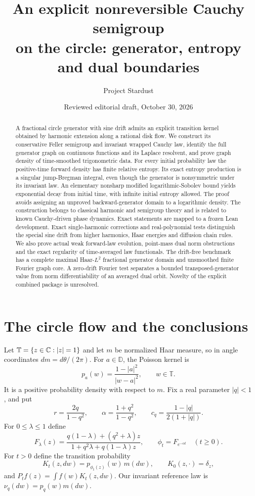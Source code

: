 \documentclass[11pt]{article}
\title{An explicit nonreversible Cauchy semigroup\protect\\
on the circle: generator, entropy and dual boundaries}
\author{Project Stardust}
\date{Reviewed editorial draft, October 30, 2026}
\newcommand{\T}{\mathbb T}\newcommand{\D}{\mathbb D}
\begin{document}
\maketitle
\begin{abstract}
A fractional circle generator with sine drift admits an
explicit transition kernel obtained by harmonic extension
along a rational disk flow. We construct its conservative
Feller semigroup and invariant wrapped Cauchy law, identify
the full generator graph on continuous functions and its
Laplace resolvent, and prove graph density of time-smoothed
trigonometric data. For every initial probability law the
positive-time forward density has finite relative entropy.
Its exact entropy production is a singular jump-Bregman
integral, even though the generator is nonsymmetric under
its invariant law. An elementary nonsharp modified
logarithmic-Sobolev bound yields exponential decay from
initial time, with infinite initial entropy allowed.
The proof avoids assigning an unproved backward-generator
domain to a logarithmic density. The construction belongs
to classical harmonic and semigroup theory and is related
to known Cauchy-driven phase dynamics. Exact statements
are mapped to a frozen Lean development. Exact single-harmonic
corrections and real-polynomial tests distinguish the special sine
drift from higher harmonics, Haar energies and diffusion chain rules.
We also prove actual weak forward-law evolution, point-mass dual norm
obstructions and the exact regularity of time-averaged law functionals.
The drift-free benchmark has a complete maximal Haar-$L^2$ fractional
generator domain and unsmoothed finite Fourier graph core.
A zero-drift Fourier test separates a bounded transposed-generator value
from norm differentiability of an averaged dual orbit. Novelty of the
explicit combined package is unresolved.
\end{abstract}

\section{The circle flow and the conclusions}
Let $\T=\{z\in\C:|z|=1\}$ and let $m$ be normalized
Haar measure, so in angle coordinates $dm=d\theta/(2\pi)$.
For $a\in\D$, the Poisson kernel is
\[
 p_a(w)=\frac{1-|a|^2}{|w-a|^2},\qquad w\in\T.
\]
It is a positive probability density with respect to $m$.
Fix a real parameter $|q|<1$, and put
\begin{equation}\label{eq:parameters}
 r=\frac{2q}{1-q^2},\qquad
 \alpha=\frac{1+q^2}{1-q^2},\qquad
 c_q=\frac{1-|q|}{2(1+|q|)}.
\end{equation}
For $0\leq\lambda\leq1$ define
\begin{equation}\label{eq:flow}
 F_\lambda(z)=
 \frac{q(1-\lambda)+(q^2+\lambda)z}
      {1+q^2\lambda+q(1-\lambda)z},\qquad
 \phi_t=F_{e^{-\alpha t}}\quad(t\geq0).
\end{equation}
For $t>0$ define the transition probability
\begin{equation}\label{eq:kernel}
 K_t(z,dw)=p_{\phi_t(z)}(w)\,m(dw),\qquad
 K_0(z,\cdot)=\delta_z,
\end{equation}
and $P_tf(z)=\int f(w)K_t(z,dw)$. Our invariant reference
law is $\nu_q(dw)=p_q(w)m(dw)$.
\end{document}
